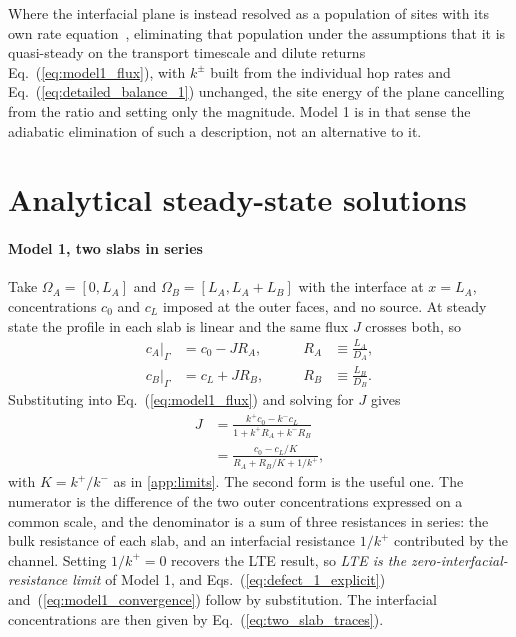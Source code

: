 \documentclass[5p]{elsarticle}
\begin{document}
Where the interfacial plane is instead resolved as a population of sites with its own rate equation~\cite{hodille_molecular_2022,silva-solis_hydrogen_2026}, eliminating that population under the assumptions that it is quasi-steady on the transport timescale and dilute returns Eq.~(\ref{eq:model1_flux}), with $k^{\pm}$ built from the individual hop rates and Eq.~(\ref{eq:detailed_balance_1}) unchanged, the site energy of the plane cancelling from the ratio and setting only the magnitude.
Model 1 is in that sense the adiabatic elimination of such a description, not an alternative to it.

\section{Analytical steady-state solutions}
\label{app:analytical}

\paragraph{Model 1, two slabs in series} Take $\Omega_A = [0, L_A]$ and $\Omega_B = [L_A, L_A + L_B]$ with the interface at $x = L_A$, concentrations $c_0$ and $c_L$ imposed at the outer faces, and no source.
At steady state the profile in each slab is linear and the same flux $J$ crosses both, so
\begin{equation}
    \begin{aligned}
        c_A\big|_\Gamma &= c_0 - J R_A ,
            &\qquad R_A &\equiv \frac{L_A}{D_A} , \\[3pt]
        c_B\big|_\Gamma &= c_L + J R_B ,
            &\qquad R_B &\equiv \frac{L_B}{D_B} .
    \end{aligned}
    \label{eq:two_slab_traces}
\end{equation}
Substituting into Eq.~(\ref{eq:model1_flux}) and solving for $J$ gives
\begin{equation}
    \begin{aligned}
        J &= \frac{k^{+}c_0 - k^{-}c_L}{1 + k^{+}R_A + k^{-}R_B} \\[3pt]
          &= \frac{c_0 - c_L/K}{R_A + R_B/K + 1/k^{+}} ,
    \end{aligned}
    \label{eq:model1_analytical}
\end{equation}
with $K = k^{+}/k^{-}$ as in \ref{app:limits}.
The second form is the useful one.
The numerator is the difference of the two outer concentrations expressed on a common scale, and the denominator is a sum of three resistances in series: the bulk resistance of each slab, and an interfacial resistance $1/k^{+}$ contributed by the channel.
Setting $1/k^{+} = 0$ recovers the LTE result, so \emph{LTE is the zero-interfacial-resistance limit} of Model 1, and Eqs.~(\ref{eq:defect_1_explicit}) and~(\ref{eq:model1_convergence}) follow by substitution.
The interfacial concentrations are then given by Eq.~(\ref{eq:two_slab_traces}).
\end{document}
